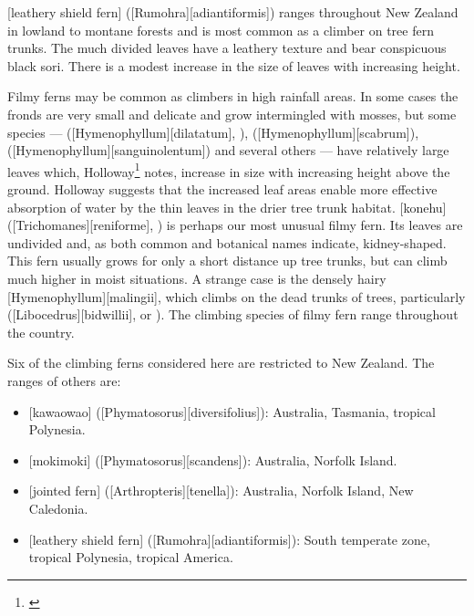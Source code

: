 [leathery shield fern] ([Rumohra][adiantiformis]) ranges throughout New Zealand in lowland to montane forests and is most common as a climber on tree fern trunks.
The much divided leaves have a leathery texture and bear conspicuous black sori.
There is a modest increase in the size of leaves with increasing height.

Filmy ferns may be common as climbers in high rainfall areas.
In some cases the fronds are very small and delicate and grow intermingled with mosses, but some species ---  ([Hymenophyllum][dilatatum], ),  ([Hymenophyllum][scabrum]),  ([Hymenophyllum][sanguinolentum]) and several others --- have relatively large leaves which, Holloway\footnote{\cite{holloway1923studies}} notes, increase in size with increasing height above the ground.
Holloway suggests that the increased leaf areas enable more effective absorption of water by the thin leaves in the drier tree trunk habitat.
[konehu] ([Trichomanes][reniforme], ) is perhaps our most unusual filmy fern.
Its leaves are undivided and, as both common and botanical names indicate, kidney-shaped.
This fern usually grows for only a short distance up tree trunks, but can climb much higher in moist situations.
A strange case is the densely hairy  [Hymenophyllum][malingii], which climbs on the dead trunks of trees, particularly  ([Libocedrus][bidwillii],  or ).
The climbing species of filmy fern range throughout the country.

Six of the climbing ferns considered here are restricted to New Zealand.
The ranges of others are:

\begin{itemize}
	\item {}[kawaowao] ([Phymatosorus][diversifolius]): Australia, Tasmania, tropical Polynesia.
	\item {}[mokimoki] ([Phymatosorus][scandens]): Australia, Norfolk Island.
	\item {}[jointed fern] ([Arthropteris][tenella]): Australia, Norfolk Island, New Caledonia.
	\item {}[leathery shield fern] ([Rumohra][adiantiformis]): South temperate zone, tropical Polynesia, tropical America.
\end{itemize}

